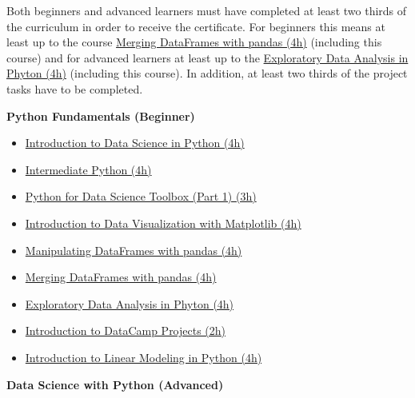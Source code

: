 \documentclass[
  11pt,
]{article}
\providecommand{\tightlist}{%
  \setlength{\itemsep}{0pt}\setlength{\parskip}{0pt}}
\newenvironment{tipsp}[1]
  {
  \begin{itemize}
  \footnotesize
  \renewcommand{\labelitemi}{
    \raisebox{-.7\height}[0pt][0pt]{
      {\setkeys{Gin}{width=3em,keepaspectratio}
        \texttt{[image: images/\#1.png]}}
    }
  }
  \setlength{\fboxsep}{1em}
  \begin{pbox}
  \item
  }
  {
  \end{pbox}
  \end{itemize}
  }
\begin{document}
Both beginners and advanced learners must have completed at least two thirds of the curriculum in order to receive the certificate. For beginners this means at least up to the course \href{https://learn.datacamp.com/courses/merging-dataframes-with-pandas}{Merging DataFrames with pandas (4h)} (including this course) and for advanced learners at least up to the \href{https://learn.datacamp.com/courses/exploratory-data-analysis-in-python}{Exploratory Data Analysis in Phyton (4h)} (including this course). In addition, at least two thirds of the project tasks have to be completed.

\begin{tipsp}p

\textbf{Python Fundamentals (Beginner) }

\begin{itemize}
\tightlist
\item
  \href{https://www.datacamp.com/courses/introduction-to-data-science-in-python}{Introduction to Data Science in Python (4h)}
\item
  \href{https://www.datacamp.com/courses/intermediate-python-for-data-science}{Intermediate Python (4h)}
\item
  \href{https://www.datacamp.com/courses/python-data-science-toolbox-part-1}{Python for Data Science Toolbox (Part 1) (3h)}
\item
  \href{https://www.datacamp.com/courses/introduction-to-matplotlib}{Introduction to Data Visualization with Matplotlib (4h)}
\item
  \href{https://www.datacamp.com/courses/manipulating-dataframes-with-pandas}{Manipulating DataFrames with pandas (4h)}
\item
  \href{https://www.datacamp.com/courses/merging-dataframes-with-pandas}{Merging DataFrames with pandas (4h)}
\item
  \href{https://www.datacamp.com/courses/exploratory-data-analysis-in-python}{Exploratory Data Analysis in Phyton (4h)}
\item
  \href{https://www.datacamp.com/projects/33}{Introduction to DataCamp Projects (2h)}
\item
  \href{https://www.datacamp.com/courses/introduction-to-linear-modeling-in-python}{Introduction to Linear Modeling in Python (4h)}
\end{itemize}

\textbf{Data Science with Python (Advanced) }


\end{tipsp}
\end{document}

